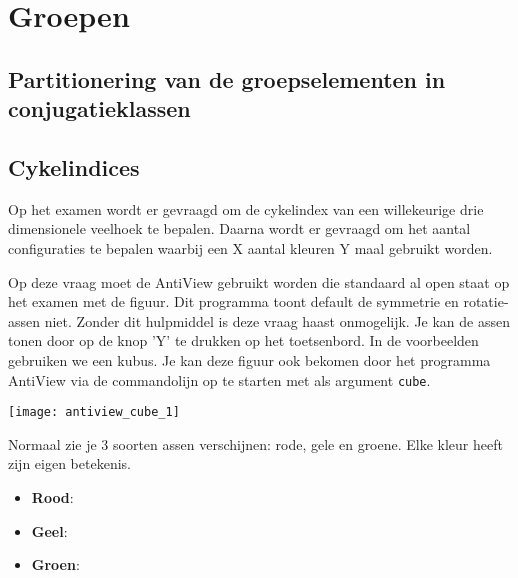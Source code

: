 \section{Groepen}

\warning{}
\subsection{Partitionering van de groepselementen in conjugatieklassen}
\subsection{Cykelindices}
Op het examen wordt er gevraagd om de cykelindex van een willekeurige drie dimensionele veelhoek te bepalen. Daarna wordt er gevraagd om het aantal configuraties te bepalen waarbij een X aantal kleuren Y maal gebruikt worden.

Op deze vraag moet de AntiView gebruikt worden die standaard al open staat op het examen met de figuur. Dit programma toont default de symmetrie en rotatie-assen niet. Zonder dit hulpmiddel is deze vraag haast onmogelijk. Je kan de assen tonen door op de knop 'Y' te drukken op het toetsenbord. In de voorbeelden gebruiken we een kubus. Je kan deze figuur ook bekomen door het programma AntiView via de commandolijn op te starten met als argument \texttt{cube}.

\begin{center}
 \texttt{[image: antiview\_cube\_1]}
\end{center}

Normaal zie je 3 soorten assen verschijnen: rode, gele en groene. Elke kleur heeft zijn eigen betekenis.
\begin{itemize}
 \item \textbf{Rood}:
 \item \textbf{Geel}:
 \item \textbf{Groen}:
\end{itemize}
